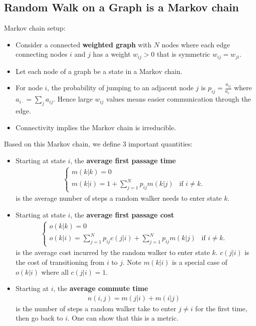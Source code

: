 \documentclass[./some_latex_template.tex]{subfiles}
\begin{document}
\subsection{Random Walk on a Graph is a Markov chain}

Markov chain setup:
\begin{itemize}
	\item Consider a connected \textbf{weighted graph} with $N$ nodes where each edge connecting nodes $i$ and $j$ has a weight $w_{ij} > 0$ that is symmetric $w_{ij} = w_{ji}$. 
	\item Let each node of a graph be a state in a Markov chain. 
	\item For node $i$, the probability of jumping to an adjacent node $j$ is $p_{ij} = \frac{a_{ij}}{a_{i\cdot}}$ where $a_{i\cdot} = \sum_{j} a_{ij}.$ Hence large $w_{ij}$ values means easier communication through the edge. 
	\item Connectivity implies the Markov chain is irreducible. 
\end{itemize}

\noindent Based on this Markov chain, we define 3 important quantities: 

\begin{itemize}
	\item Starting at state $i$, the \textbf{average first passage time} \begin{align*}		
		\begin{cases}
			m(k|k) = 0 \\
			m(k|i) = 1 + \sum_{j=1}^N p_{ij}m(k|j) & \text{if } i\neq k.
		\end{cases}
	\end{align*}
	is the average number of steps a random walker needs to enter state $k$.
	\item Starting at state $i$, the \textbf{average first passage cost} \begin{align*}		
		\begin{cases}
			o(k|k) = 0 \\
			o(k|i) = \sum_{j=1}^N p_{ij}c(j|i) + \sum_{j=1}^N p_{ij}m(k|j) & \text{if } i\neq k.
		\end{cases}
	\end{align*}
	is the average cost incurred by the random walker to enter state $k$. $c(j|i)$ is the cost of transitioning from $i$ to $j$. Note $m(k|i)$ is a special case of $o(k|i)$ where all $c(j|i) = 1$. 
	\item Starting at $i$, the \textbf{average commute time} 
	\begin{align*}
		n(i,j) = m(j|i) + m(i|j)
	\end{align*}
	is the number of steps a random walker take to enter $j \neq i$ for the first time, then go back to $i$. One can show that this is a metric. 
\end{itemize}
\end{document}
